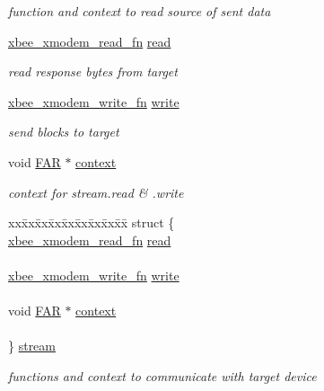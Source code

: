 \begin{DoxyCompactItemize}
\begin{tabbing}
\end{tabbing}\begin{DoxyCompactList}\small\item\em function and context to read source of sent data \end{DoxyCompactList}\item 
\hyperlink{group__util__xmodem_ga25f49dbd4c2f9e274a32217a709d6382}{xbee\+\_\+xmodem\+\_\+read\+\_\+fn} \hyperlink{group__util__xmodem_gac73e7e9b654a58e232f8c1380cd68dfa}{read}
\begin{DoxyCompactList}\small\item\em read response bytes from target \end{DoxyCompactList}\item 
\hyperlink{group__util__xmodem_ga57f329cc7f4e1b18f5baddb888221d7f}{xbee\+\_\+xmodem\+\_\+write\+\_\+fn} \hyperlink{group__util__xmodem_ga4224f3519ed62f804de9c45d0a409f94}{write}
\begin{DoxyCompactList}\small\item\em send blocks to target \end{DoxyCompactList}\item 
void \hyperlink{group__hal_gaef060b3456fdcc093a7210a762d5f2ed}{F\+AR} $\ast$ \hyperlink{group__util__xmodem_gaa91f8e864e06077c354e5f5216547758}{context}
\begin{DoxyCompactList}\small\item\em context for stream.\+read \& .write \end{DoxyCompactList}\item 
\mbox{\label{group__util__xmodem_gac9e2099087190f80f9f0dd85363100b2}} 
\begin{tabbing}
xx\=xx\=xx\=xx\=xx\=xx\=xx\=xx\=xx\=\kill
struct \{\\
\>\hyperlink{group__util__xmodem_ga25f49dbd4c2f9e274a32217a709d6382}{xbee\_xmodem\_read\_fn} \hyperlink{group__util__xmodem_gac73e7e9b654a58e232f8c1380cd68dfa}{read}\\
\>\\
\>\hyperlink{group__util__xmodem_ga57f329cc7f4e1b18f5baddb888221d7f}{xbee\_xmodem\_write\_fn} \hyperlink{group__util__xmodem_ga4224f3519ed62f804de9c45d0a409f94}{write}\\
\>\\
\>void \hyperlink{group__hal_gaef060b3456fdcc093a7210a762d5f2ed}{FAR} $\ast$ \hyperlink{group__util__xmodem_gaa91f8e864e06077c354e5f5216547758}{context}\\
\>\\
\} \hyperlink{group__util__xmodem_gac9e2099087190f80f9f0dd85363100b2}{stream}\\

\end{tabbing}\begin{DoxyCompactList}\small\item\em functions and context to communicate with target device \end{DoxyCompactList}\end{DoxyCompactItemize}

